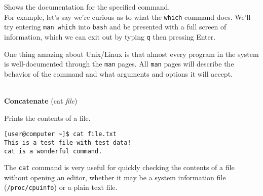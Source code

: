 \documentclass[11pt,oneside]{article}
\newenvironment{articleSectionN}[1]
{#1}
{}
\begin{document}
\begin{articleSectionN}
Shows the documentation for the specified command.\\

For example, let's say we're curious as to what the \lstinline{which} command does. We'll try entering \lstinline{man which} into \lstinline{bash} and be presented with a full screen of information, which we can exit out by typing \lstinline{q} then pressing Enter.

One thing amazing about Unix/Linux is that almost every program in the system is well-documented through the \lstinline{man} pages. All \lstinline{man} pages will describe the behavior of the command and what arguments and options it will accept.

\quad \\
\noindent\textbf{Concatenate} (cat \emph{file})

\noindent Prints the contents of a file.

\begin{lstlisting}
[user@computer ~]$ cat file.txt
This is a test file with test data!
cat is a wonderful command.
\end{lstlisting}

The \lstinline{cat} command is very useful for quickly checking the contents of a file without opening an editor, whether it may be a system information file (\lstinline{/proc/cpuinfo}) or a plain text file.
\end{articleSectionN}
\end{document}
